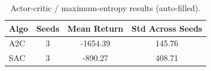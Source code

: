 \begin{table}[h]
\centering
\caption{Actor-critic / maximum-entropy results (auto-filled).}
\label{tab:acresults}
\begin{tabular}{lccc}
\toprule
Algo & Seeds & Mean Return & Std Across Seeds \\
\midrule
A2C & 3 & -1654.39 & 145.76 \\
SAC & 3 & -890.27 & 408.71 \\
\bottomrule
\end{tabular}
\end{table}
